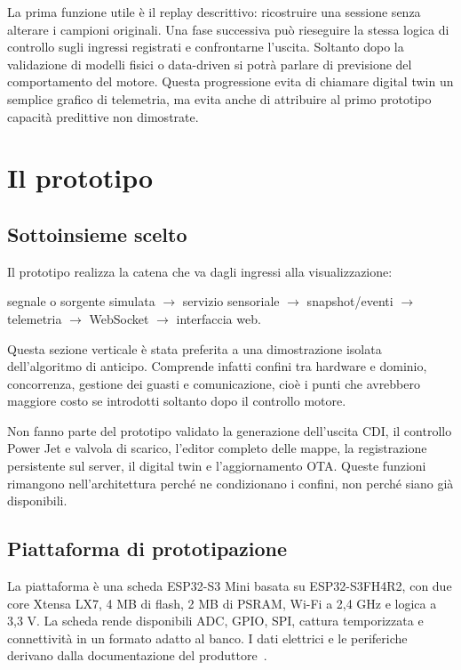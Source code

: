 \documentclass{article}
\begin{document}
La prima funzione utile è il replay descrittivo: ricostruire una sessione senza
alterare i campioni originali. Una fase successiva può rieseguire la stessa
logica di controllo sugli ingressi registrati e confrontarne l'uscita. Soltanto
dopo la validazione di modelli fisici o data-driven si potrà parlare di
previsione del comportamento del motore. Questa progressione evita di chiamare
digital twin un semplice grafico di telemetria, ma evita anche di attribuire al
primo prototipo capacità predittive non dimostrate.

\section{Il prototipo}
\label{sec:prototipo}

\subsection{Sottoinsieme scelto}

Il prototipo realizza la catena che va dagli ingressi alla visualizzazione:

\begin{center}
segnale o sorgente simulata $\rightarrow$ servizio sensoriale $\rightarrow$
snapshot/eventi $\rightarrow$ telemetria $\rightarrow$ WebSocket
$\rightarrow$ interfaccia web.
\end{center}

Questa sezione verticale è stata preferita a una dimostrazione isolata
dell'algoritmo di anticipo. Comprende infatti confini tra hardware e dominio,
concorrenza, gestione dei guasti e comunicazione, cioè i punti che avrebbero
maggiore costo se introdotti soltanto dopo il controllo motore.

Non fanno parte del prototipo validato la generazione dell'uscita CDI, il
controllo Power Jet e valvola di scarico, l'editor completo delle mappe, la
registrazione persistente sul server, il digital twin e l'aggiornamento OTA.
Queste funzioni rimangono nell'architettura perché ne condizionano i confini,
non perché siano già disponibili.

\subsection{Piattaforma di prototipazione}

La piattaforma è una scheda ESP32-S3 Mini basata su ESP32-S3FH4R2, con due core
Xtensa LX7, 4 MB di flash, 2 MB di PSRAM, Wi-Fi a 2,4 GHz e logica a 3,3 V. La
scheda rende disponibili ADC, GPIO, SPI, cattura temporizzata e connettività in
un formato adatto al banco. I dati elettrici e le periferiche derivano dalla
documentazione del produttore~\cite{esp32s3_datasheet}.
\end{document}
